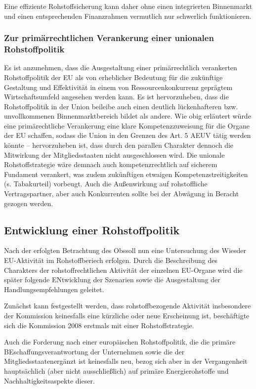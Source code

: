 \documentclass[12pt,a4paper,oneside]{book} %
\begin{document}
Eine effiziente Rohstoffsicherung kann daher ohne einen integrierten Binnenmarkt und einen entsprechenden Finanzrahmen vermutlich nur schwerlich funktionieren.

	
\subsubsection{Zur primärrechtlichen Verankerung einer unionalen Rohstoffpolitik}
Es ist anzunehmen, dass die Ausgestaltung einer primärrechtlich verankerten Rohstoffpolitik der EU als von erheblicher Bedeutung für die zukünftige Gestaltung und Effektivität in einem von Ressourcenkonkurrenz geprägtem Wirtschaftsumfeld angesehen werden kann. Es ist hervorzuheben, dass die Rohstoffpolitik in der Union beileibe auch einen deutlich lückenhafteren bzw. unvollkommenen Binnenmarktbereich bildet als andere.  Wie obig erläutert würde eine primärechtliche Verankerung eine klare Kompetenzzuweisung für die Organe der EU schaffen, sodass die Union in den Grenzen des Art. 5 AEUV tätig werden könnte -- hervorzuheben ist, dass durch den parallen Charakter dennoch die Mitwirkung der Mitgliedsstaaten nicht ausgeschlossen wird. Die unionale Rohstoffstrategie wäre demnach auch kompetenzrechtlich auf sicherem Fundament verankert, was zudem zukünftigen etwaigen Kompetenzstreitigkeiten (s. Tabakurteil) vorbeugt. Auch die Außenwirkung auf rohstoffliche Vertragspartner, aber auch Konkurrenten sollte bei der Abwägung in Beracht gezogen werden.


		
\subsection{Entwicklung einer Rohstoffpolitik}

Nach der erfolgten Betrachtung des \glqq Obs\grqq soll nun eine Untersuchung des \glqq Wies\grqq der EU-Aktivität im Rohstoffberiech erfolgen. Durch die Beschreibung des Charakters der rohstoffrechtlichen Aktivität der einzelnen EU-Organe wird die später folgende ENtwicklung der Szenarien sowie die Ausgestaltung der Handlungsempfehlungen geleitet.

Zunächst kann festgestellt werden, dass rohstoffbezogende Aktivität insbesondere der Kommission keinesfalls eine kürzliche oder neue Erscheinung ist, beschäftigte sich die Kommission 2008 erstmals mit einer Rohstoffstrategie.

Auch die Forderung nach einer europäischen Rohstoffpolitik, die die \glqq primäre BEschaffungsverantwortung der Unternehmen sowie die der Mitgliedsstaaten\grqq ergänzt ist keinesfalls neu, bezog sich aber in der Vergangenheit hauptsächlich (aber nicht ausschließlich) auf primäre Energierohstoffe und Nachhaltigkeitsaspekte dieser.\autocite{Schorkopf, Europäische Rohstoffverwaltung, Rn. 3}
\end{document}
